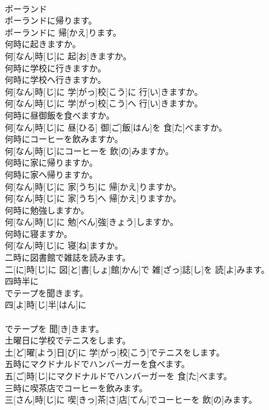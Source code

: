 \documentclass[8pt]{extreport}
\begin{document}
\begin{CJK}{UTF8}{min}
\\	ポーランド
\\	ポーランドに帰ります。	
\\	ポーランドに 帰[かえ]ります。
\\	何時に起きますか。	
\\	何[なん]時[じ]に 起[お]きますか。
\\	何時に学校に行きますか。 
\\	何時に学校へ行きますか。	
\\	何[なん]時[じ]に 学[がっ]校[こう]に 行[い]きますか。 
\\	何[なん]時[じ]に 学[がっ]校[こう]へ 行[い]きますか。
\\	何時に昼御飯を食べますか。	
\\	何[なん]時[じ]に 昼[ひる] 御[ご]飯[はん]を 食[た]べますか。
\\	何時にコーヒーを飲みますか。	
\\	何[なん]時[じ]にコーヒーを 飲[の]みますか。
\\	何時に家に帰りますか。 
\\	何時に家へ帰りますか。	
\\	何[なん]時[じ]に 家[うち]に 帰[かえ]りますか。 
\\	何[なん]時[じ]に 家[うち]へ 帰[かえ]りますか。
\\	何時に勉強しますか。	
\\	何[なん]時[じ]に 勉[べん]強[きょう]しますか。
\\	何時に寝ますか。	
\\	何[なん]時[じ]に 寝[ね]ますか。
\\	二時に図書館で雑誌を読みます。	
\\	二[に]時[じ]に 図[と]書[しょ]館[かん]で 雑[ざっ]誌[し]を 読[よ]みます。
\\	四時半に
\\	でテープを聞きます。	
\\	四[よ]時[じ]半[はん]に 
\\	[エル]
\\	[エル]でテープを 聞[き]きます。
\\	土曜日に学校でテニスをします。	
\\	土[ど]曜[よう]日[び]に 学[がっ]校[こう]でテニスをします。
\\	五時にマクドナルドでハンバーガーを食べます。	
\\	五[ご]時[じ]にマクドナルドでハンバーガーを 食[た]べます。
\\	三時に喫茶店でコーヒーを飲みます。	
\\	三[さん]時[じ]に 喫[きっ]茶[さ]店[てん]でコーヒーを 飲[の]みます。

\end{CJK}
\end{document}
